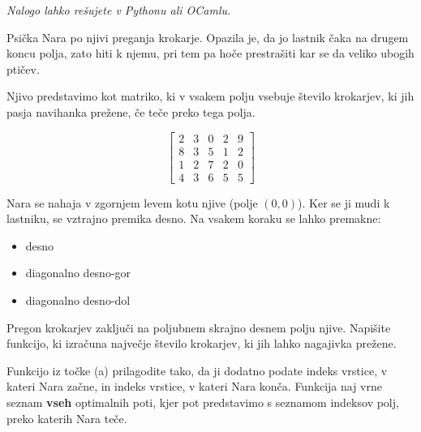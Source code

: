 \documentclass[arhiv]{../izpit}
\begin{document}
\naloga[\tocke{20}]
\emph{Nalogo lahko rešujete v Pythonu ali OCamlu.}

Psička Nara po njivi preganja krokarje. Opazila je, da jo lastnik čaka na drugem koncu polja, zato hiti k njemu, pri tem pa hoče prestrašiti kar se da veliko ubogih ptičev.

Njivo predstavimo kot matriko, ki v vsakem polju vsebuje število krokarjev, ki jih pasja navihanka prežene, če teče preko tega polja.

\[
\begin{bmatrix}
2& 3& 0& 2& 9\\
8& 3& 5& 1& 2\\
1& 2& 7& 2& 0\\
4& 3& 6& 5& 5
\end{bmatrix}
\]

\podnaloga[\tocke{10}]
Nara se nahaja v zgornjem levem kotu njive (polje $(0, 0)$). Ker se ji mudi k lastniku, se vztrajno premika desno. Na vsakem koraku se lahko premakne:
\begin{itemize}
\item desno
\item diagonalno desno-gor
\item diagonalno desno-dol
\end{itemize}

Pregon krokarjev zaključi na poljubnem skrajno desnem polju njive. Napišite funkcijo, ki izračuna največje število krokarjev, ki jih lahko nagajivka prežene.

\podnaloga[\tocke{10}]
Funkcijo iz točke (a) prilagodite tako, da ji dodatno podate indeks vrstice, v kateri Nara začne, in indeks vrstice, v kateri Nara konča. Funkcija naj vrne seznam \textbf{vseh} optimalnih poti, kjer pot predstavimo s seznamom indeksov polj, preko katerih Nara teče.
\end{document}
